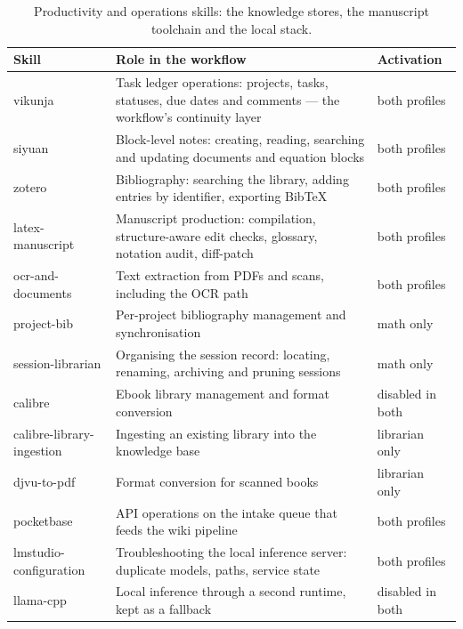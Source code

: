 \documentclass[10pt]{article}
\begin{document}
\begin{table}[htbp]
\centering\footnotesize
\caption{Productivity and operations skills: the knowledge stores, the manuscript toolchain and the local stack.}\label{tab:skillsprod}
\renewcommand{\arraystretch}{1.15}
\begin{tabularx}{\textwidth}{@{}>{\raggedright\arraybackslash}p{3.5cm} X >{\raggedright\arraybackslash}p{2.3cm}@{}}
\toprule
\textbf{Skill} & \textbf{Role in the workflow} & \textbf{Activation} \\
\midrule
vikunja & Task ledger operations: projects, tasks, statuses, due dates and comments --- the workflow's continuity layer & both profiles \\
siyuan & Block-level notes: creating, reading, searching and updating documents and equation blocks & both profiles \\
zotero & Bibliography: searching the library, adding entries by identifier, exporting BibTeX & both profiles \\
latex-manuscript & Manuscript production: compilation, structure-aware edit checks, glossary, notation audit, diff-patch & both profiles \\
ocr-and-documents & Text extraction from PDFs and scans, including the OCR path & both profiles \\
project-bib & Per-project bibliography management and synchronisation & math only \\
session-librarian & Organising the session record: locating, renaming, archiving and pruning sessions & math only \\
calibre & Ebook library management and format conversion & disabled in both \\
calibre-library-ingestion & Ingesting an existing library into the knowledge base & librarian only \\
djvu-to-pdf & Format conversion for scanned books & librarian only \\
pocketbase & API operations on the intake queue that feeds the wiki pipeline & both profiles \\
lmstudio-configuration & Troubleshooting the local inference server: duplicate models, paths, service state & both profiles \\
llama-cpp & Local inference through a second runtime, kept as a fallback & disabled in both \\
\bottomrule
\end{tabularx}
\end{table}
\end{document}
